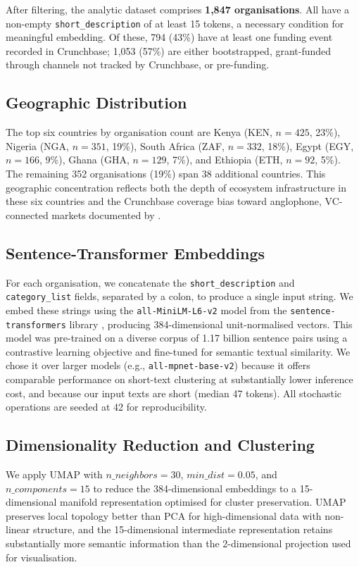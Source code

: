 \documentclass[review,12pt]{elsarticle}
\begin{document}
After filtering, the analytic dataset comprises \textbf{1,847
organisations}. All have a non-empty \texttt{short\_description}
of at least 15 tokens, a necessary condition for meaningful
embedding. Of these, 794 (43\%) have at least one funding event
recorded in Crunchbase; 1,053 (57\%) are either bootstrapped,
grant-funded through channels not tracked by Crunchbase, or
pre-funding.

\subsection{Geographic Distribution}

The top six countries by organisation count are Kenya (KEN,
$n = 425$, 23\%), Nigeria (NGA, $n = 351$, 19\%), South Africa
(ZAF, $n = 332$, 18\%), Egypt (EGY, $n = 166$, 9\%), Ghana
(GHA, $n = 129$, 7\%), and Ethiopia (ETH, $n = 92$, 5\%). The
remaining 352 organisations (19\%) span 38 additional countries.
This geographic concentration reflects both the depth of ecosystem
infrastructure in these six countries and the Crunchbase coverage
bias toward anglophone, VC-connected markets documented by
\citet{rodriguez2021crunchbase}.

\subsection{Sentence-Transformer Embeddings}

For each organisation, we concatenate the
\texttt{short\_description} and \texttt{category\_list} fields,
separated by a colon, to produce a single input string. We embed
these strings using the \texttt{all-MiniLM-L6-v2} model from the
\texttt{sentence-transformers} library \citep{reimers2019sentence},
producing 384-dimensional unit-normalised vectors. This model was
pre-trained on a diverse corpus of 1.17 billion sentence pairs using
a contrastive learning objective and fine-tuned for semantic textual
similarity. We chose it over larger models (e.g.,
\texttt{all-mpnet-base-v2}) because it offers comparable performance
on short-text clustering at substantially lower inference cost, and
because our input texts are short (median 47 tokens). All stochastic
operations are seeded at 42 for reproducibility.

\subsection{Dimensionality Reduction and Clustering}

We apply UMAP \citep{mcinnes2018umap} with $n\_neighbors = 30$,
$min\_dist = 0.05$, and $n\_components = 15$ to reduce the
384-dimensional embeddings to a 15-dimensional manifold
representation optimised for cluster preservation. UMAP preserves
local topology better than PCA for high-dimensional data with
non-linear structure, and the 15-dimensional intermediate
representation retains substantially more semantic information than
the 2-dimensional projection used for visualisation.
\end{document}
